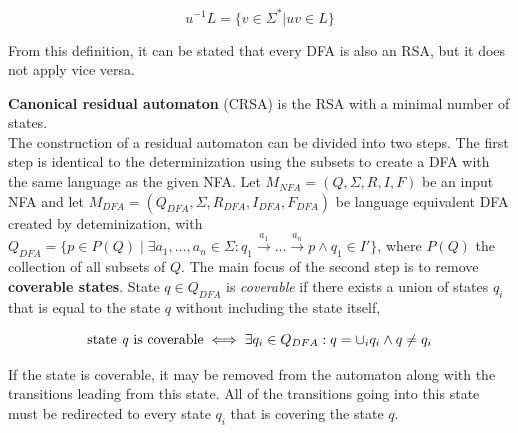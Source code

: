 \begin{equation*}
{u^{-1}L = \{v \in \Sigma^*|uv \in L\}}
\end{equation*}

From this definition, it can be stated that every DFA is also an RSA, but it does not apply vice versa.

\textbf{Canonical residual automaton} (CRSA) is the RSA with a minimal number of states. \\

The construction of a residual automaton can be divided into two steps. The first step is identical to the determinization using the subsets to create a DFA with the same language as the given NFA. Let ${M_{NFA}=(Q, \Sigma, R, I, F)}$ be an input NFA and let \linebreak ${M_{DFA}=(Q_{DFA}, \Sigma, R_{DFA}, I_{DFA}, F_{DFA})}$ be language equivalent DFA created by deteminization, with $Q_{DFA}=\{p \in P(Q) \mid \exists a_1,\dots,a_n \in \Sigma: q_1 \xrightarrow{a_1} \dots \xrightarrow{a_n} p \land q_1 \in I' \}$, where $P(Q)$ the collection of all subsets of $Q$. The main focus of the second step is to remove \textbf{coverable states}. State $q \in Q_{DFA}$ is \textit{coverable} if there exists a union of states $q_i$ that is equal to the state $q$ without including the state itself,

\begin{equation*}
\text{state \textit{q} is coverable} \iff \exists q_i \in Q_{DFA}: q = \cup_{i} q_i \land q \neq q_i
\end{equation*}

If the state is coverable, it may be removed from the automaton along with the transitions leading from this state. All of the transitions going into this state must be redirected to every state $q_i$ that is covering the state $q$.

